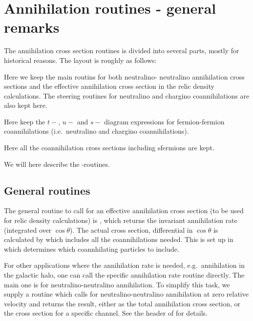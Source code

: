 
\section{Annihilation routines - general remarks}

The annihilation cross section routines is divided into several parts,
mostly for historical reasons. The layout is roughly as follows:
\begin{description}
  \item{} Here we keep the main routins for both neutralino-
  neutralino annihilation cross sections and the effective annihilation
  cross section in the relic density calculations. The steering routines
  for neutralino and chargino coannihilations are also kept here.
  
\item{} Here keep the $t-$, $u-$ and $s-$ diagram expressions
for fermion-fermion coannihilations (i.e.\ neutralino and chargino
coannihilations).

\item{} Here all the coannihilation cross sections including
sfermions are kept.

\end{description}

We will here describe the -routines.


\subsection{General routines}

The general routine to call for an effective annihilation cross section (to
be used for relic density calculations) is , which returns the
invariant annihilation rate (integrated over $\cos \theta$). The actual
cross section, differential in $\cos \theta$ is calculated by 
 which includes all the coannihilations needed. This is set
up in  which determines which coannhilating particles
to include.

For other applications where the annihilation rate is needed, e.g.\ annihilation
in the galactic halo, one can call the specific annihilation rate routine
directly. The main one is  for neutralino-neutralino
annihilation. To simplify this task, we supply a routine  which
calls  for neutralino-neutralino annihilation at zero
relative velocity and returns the result, either as the total annihilation
cross section, or the cross section for a specific channel. See the header of
 for details.


